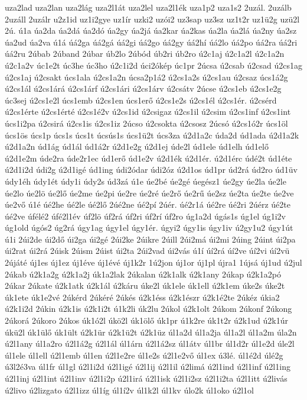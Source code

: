 {uza2lad
uza2lan
uza2lág
uza2l1át
uza2lel
uza2l1ék
uza1p2
uza1s2
2uzál.
2uzálb
2uzáll
2uzálr
u2z1id
uz1i2gye
uz1ír
uzki2
uzói2
uz3sap
uz3sz
uz1t2r
uz1ü2g
uzü2l
2ú.
ú1a
úa2da
úa2dá
úa2dó
úa2gy
úa2já
úa2kar
úa2kas
úa2la
úa2lá
úa2ny
úa2sz
úa2ud
úa2va
ú1á
úá2ga
úá2gá
úá2gi
úá2go
úá2gy
úá2hí
úá2lo
úá2po
úá2ra
úá2ri
úá2ru
2úbab
2úband
2úbar
úb2lo
2úbód
úb2ri
úb2ro
ú2c1aj
ú2c1a2l
ú2c1a2n
ú2c1a2v
úc1e2t
úc3he
úc3ho
ú2c1i2d
úci2ókép
úc1pr
2úcsa
ú2csab
ú2csad
ú2cs1ag
ú2cs1aj
ú2csakt
úcs1ala
ú2cs1a2n
úcsa2p1á2
ú2cs1a2s
ú2cs1au
ú2csaz
úcs1á2g
ú2cs1ál
ú2cs1árá
ú2cs1árf
ú2cs1ári
ú2cs1árv
ú2csátv
2úcse
ú2cs1eb
ú2cs1e2g
úc3sej
ú2cs1e2l
úcs1emb
ú2cs1en
úcs1erő
ú2cs1e2s
ú2cs1él
ú2cs1ér.
ú2csérd
ú2cs1érte
ú2cs1érté
ú2cs1é2v
ú2cs1id
ú2csigaz
ú2cs1il
ú2csim
ú2cs1inf
ú2cs1int
úcs1i2pa
ú2csirá
ú2cs1is
ú2cs1iz
2úcso
ú2csokta
ú2csosz
2úcsó
ú2cs1ó2r
úcs1öl
úcs1ös
úcs1p
úcs1s
úcs1t
úcsús1s
úcs1ü2t
úcs3za
ú2d1a2c
úda2d
úd1ada
ú2d1a2k
ú2d1a2n
úd1ág
úd1ál
úd1á2r
ú2d1e2g
ú2d1ej
úde2l
úd1ele
úd1elh
úd1elő
ú2d1e2m
úde2ra
úde2r1ec
úd1erő
úd1e2v
ú2d1ék
ú2d1ér.
ú2d1érc
údé2t
úd1éte
ú2d1i2d
údi2g
ú2d1igé
úd1ing
údi2ódar
údi2óz
ú2d1os
úd1pr
úd2rá
úd2ro
úd1üv
údy1éh
údy1ét
údy1i
údy2s
úd3zá
ú1e
úe2bé
úe2gé
úegész1
úe2gy
úe2la
úe2le
úe2lo
úe2lö
úe2lő
úe2me
úe2pi
úe2re
úe2ré
úe2rő
úe2rű
úe2sz
úe2ta
úe2te
úe2ve
úe2vő
ú1é
úé2he
úé2le
úé2lő
2úé2ne
úé2pí
2úér.
úé2r1á
úé2re
úé2ri
2úérz
úé2te
úé2ve
úfélé2
úfé2l1év
úf2lö
úf2rá
úf2ri
úf2rí
úf2ro
úg1a2d
úgás1s
úg1el
úg1i2v
úg1old
úgós2
úg2rá
úgy1ag
úgy1el
úgy1ér.
úgyi2
úgy1is
úgy1iv
ú2gy1u2
úgy1út
ú1i
2úi2de
úi2dő
úi2ga
úi2gé
2úi2ke
2úikre
2úill
2úi2má
úi2mi
2úing
2úint
úi2pa
úi2rat
úi2rá
2úisk
2úism
2úist
úi2ta
2úi2vad
úi2vás
ú1í
úí2rá
úí2ve
úí2vi
úí2vü
2újáté
új1es
új1ez
új1éve
új1évé
új1k2r
1ú2jon
új1or
új1pl
újra1
1újsá
új1ud
ú2jul
2úkab
ú2k1a2g
ú2k1a2j
úk1a2lak
2úkalan
ú2k1alk
ú2k1any
2úkap
ú2k1a2pó
2úkar
2úkate
ú2k1atk
ú2k1ál
ú2káru
úke2l
úk1ele
úk1ell
ú2k1em
úke2s
úke2t
úk1ete
úk1e2vé
2úkérd
2úkéré
2úkés
ú2k1éss
ú2k1észr
ú2k1é2te
2úkéz
úkia2
ú2k1i2d
2úkin
ú2k1is
ú2k1i2t
ú1k2li
úk2lu
2úkol
ú2k1olt
2úkom
2úkonf
2úkong
2úkorá
2úkoro
2úkos
úk1ó2l
úkö2l
úk1ölő
úk1pr
ú1k2re
úk1t2r
ú2k1ud
ú2k1úr
úkü2l
úk1ülő
úk1ült
ú2k1ür
ú2k1ü2t
ú2k1üz
úl1a2d
úl1a2ja
úl1a2l
úl1a2m
úla2n
ú2l1any
úl1a2ro
ú2l1á2g
ú2l1ál
úl1árn
ú2l1á2sz
úl1átv
úl1br
úl1d2r
úl1e2d
úle2l
úl1ele
úl1ell
ú2l1emb
úl1en
ú2l1e2re
úl1e2s
ú2l1e2vő
úl1ex
ú3lé.
úl1é2d
úlé2g
ú3l2é3va
úl1fr
úl1gl
ú2l1i2d
ú2l1igé
ú2l1ij
ú2l1il
ú2limá
ú2l1ind
ú2l1inf
ú2l1ing
ú2l1inj
ú2l1int
ú2l1inv
ú2l1i2p
ú2l1irá
ú2l1isk
ú2l1i2sz
ú2l1i2ta
ú2l1itt
ú2livás
ú2livo
ú2lizgato
ú2l1izz
úl1íg
úl1í2v
úl1k2l
úl1kv
úlo2k
úl1oko
ú2l1ol
}
